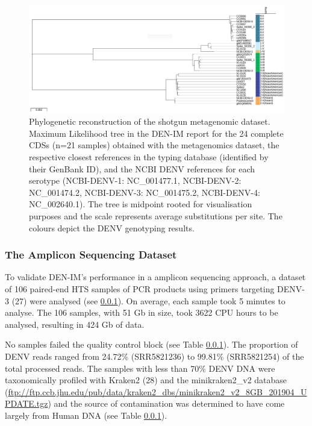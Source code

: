 \begin{figure}[h!]
\centering
\includegraphics[width=\textwidth]{figures/chapter 4/Figure2_nobranchlabels.png}
\caption{Phylogenetic reconstruction of the shotgun metagenomic dataset. Maximum Likelihood tree in the DEN-IM report for the 24 complete CDSs (n=21 samples) obtained with the metagenomics dataset, the respective closest references in the typing database (identified by their GenBank ID), and the NCBI DENV references for each serotype (NCBI-DENV-1: NC\_001477.1, NCBI-DENV-2: NC\_001474.2, NCBI-DENV-3: NC\_001475.2, NCBI-DENV-4: NC\_002640.1). The tree is midpoint rooted for visualisation purposes and the scale represents average substitutions per site. The colours depict the DENV genotyping results.}
\label{fig:chap4_figure2}
\end{figure}

\subsubsection{The Amplicon Sequencing Dataset}

To validate DEN-IM’s performance in a amplicon sequencing approach, a dataset of 106 paired-end HTS samples of PCR products using primers targeting DENV-3 (27) were analysed (see \ref{}). On average, each sample took 5 minutes to analyse. The 106 samples, with 51 Gb in size, took 3622 CPU hours to be analysed, resulting in 424 Gb of data. 

No samples failed the quality control block (see Table \ref{}). The proportion of DENV reads ranged from 24.72\% (SRR5821236) to 99.81\% (SRR5821254) of the total processed reads. The samples with less than 70\% DENV DNA were taxonomically profiled with Kraken2 (28) and the minikraken2\_v2 database (\url{ftp://ftp.ccb.jhu.edu/pub/data/kraken2_dbs/minikraken2_v2_8GB_201904_UPDATE.tgz}) and the source of contamination was determined to have come largely from Human DNA (see Table \ref{}).

